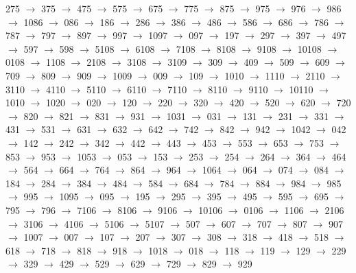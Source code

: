 275 $\rightarrow$ 375 $\rightarrow$ 475 $\rightarrow$ 575 $\rightarrow$ 675 $\rightarrow$ 775 $\rightarrow$ 875 $\rightarrow$ 975 $\rightarrow$ 976 $\rightarrow$ 986 $\rightarrow$ 1086 $\rightarrow$ 086 $\rightarrow$ 186 $\rightarrow$ 286 $\rightarrow$ 386 $\rightarrow$ 486 $\rightarrow$ 586 $\rightarrow$ 686 $\rightarrow$ 786 $\rightarrow$ 787 $\rightarrow$ 797 $\rightarrow$ 897 $\rightarrow$ 997 $\rightarrow$ 1097 $\rightarrow$ 097 $\rightarrow$ 197 $\rightarrow$ 297 $\rightarrow$ 397 $\rightarrow$ 497 $\rightarrow$ 597 $\rightarrow$ 598 $\rightarrow$ 5108 $\rightarrow$ 6108 $\rightarrow$ 7108 $\rightarrow$ 8108 $\rightarrow$ 9108 $\rightarrow$ 10108 $\rightarrow$ 0108 $\rightarrow$ 1108 $\rightarrow$ 2108 $\rightarrow$ 3108 $\rightarrow$ 3109 $\rightarrow$ 309 $\rightarrow$ 409 $\rightarrow$ 509 $\rightarrow$ 609 $\rightarrow$ 709 $\rightarrow$ 809 $\rightarrow$ 909 $\rightarrow$ 1009 $\rightarrow$ 009 $\rightarrow$ 109 $\rightarrow$ 1010 $\rightarrow$ 1110 $\rightarrow$ 2110 $\rightarrow$ 3110 $\rightarrow$ 4110 $\rightarrow$ 5110 $\rightarrow$ 6110 $\rightarrow$ 7110 $\rightarrow$ 8110 $\rightarrow$ 9110 $\rightarrow$ 10110 $\rightarrow$ 1010 $\rightarrow$ 1020 $\rightarrow$ 020 $\rightarrow$ 120 $\rightarrow$ 220 $\rightarrow$ 320 $\rightarrow$ 420 $\rightarrow$ 520 $\rightarrow$ 620 $\rightarrow$ 720 $\rightarrow$ 820 $\rightarrow$ 821 $\rightarrow$ 831 $\rightarrow$ 931 $\rightarrow$ 1031 $\rightarrow$ 031 $\rightarrow$ 131 $\rightarrow$ 231 $\rightarrow$ 331 $\rightarrow$ 431 $\rightarrow$ 531 $\rightarrow$ 631 $\rightarrow$ 632 $\rightarrow$ 642 $\rightarrow$ 742 $\rightarrow$ 842 $\rightarrow$ 942 $\rightarrow$ 1042 $\rightarrow$ 042 $\rightarrow$ 142 $\rightarrow$ 242 $\rightarrow$ 342 $\rightarrow$ 442 $\rightarrow$ 443 $\rightarrow$ 453 $\rightarrow$ 553 $\rightarrow$ 653 $\rightarrow$ 753 $\rightarrow$ 853 $\rightarrow$ 953 $\rightarrow$ 1053 $\rightarrow$ 053 $\rightarrow$ 153 $\rightarrow$ 253 $\rightarrow$ 254 $\rightarrow$ 264 $\rightarrow$ 364 $\rightarrow$ 464 $\rightarrow$ 564 $\rightarrow$ 664 $\rightarrow$ 764 $\rightarrow$ 864 $\rightarrow$ 964 $\rightarrow$ 1064 $\rightarrow$ 064 $\rightarrow$ 074 $\rightarrow$ 084 $\rightarrow$ 184 $\rightarrow$ 284 $\rightarrow$ 384 $\rightarrow$ 484 $\rightarrow$ 584 $\rightarrow$ 684 $\rightarrow$ 784 $\rightarrow$ 884 $\rightarrow$ 984 $\rightarrow$ 985 $\rightarrow$ 995 $\rightarrow$ 1095 $\rightarrow$ 095 $\rightarrow$ 195 $\rightarrow$ 295 $\rightarrow$ 395 $\rightarrow$ 495 $\rightarrow$ 595 $\rightarrow$ 695 $\rightarrow$ 795 $\rightarrow$ 796 $\rightarrow$ 7106 $\rightarrow$ 8106 $\rightarrow$ 9106 $\rightarrow$ 10106 $\rightarrow$ 0106 $\rightarrow$ 1106 $\rightarrow$ 2106 $\rightarrow$ 3106 $\rightarrow$ 4106 $\rightarrow$ 5106 $\rightarrow$ 5107 $\rightarrow$ 507 $\rightarrow$ 607 $\rightarrow$ 707 $\rightarrow$ 807 $\rightarrow$ 907 $\rightarrow$ 1007 $\rightarrow$ 007 $\rightarrow$ 107 $\rightarrow$ 207 $\rightarrow$ 307 $\rightarrow$ 308 $\rightarrow$ 318 $\rightarrow$ 418 $\rightarrow$ 518 $\rightarrow$ 618 $\rightarrow$ 718 $\rightarrow$ 818 $\rightarrow$ 918 $\rightarrow$ 1018 $\rightarrow$ 018 $\rightarrow$ 118 $\rightarrow$ 119 $\rightarrow$ 129 $\rightarrow$ 229 $\rightarrow$ 329 $\rightarrow$ 429 $\rightarrow$ 529 $\rightarrow$ 629 $\rightarrow$ 729 $\rightarrow$ 829 $\rightarrow$ 929 